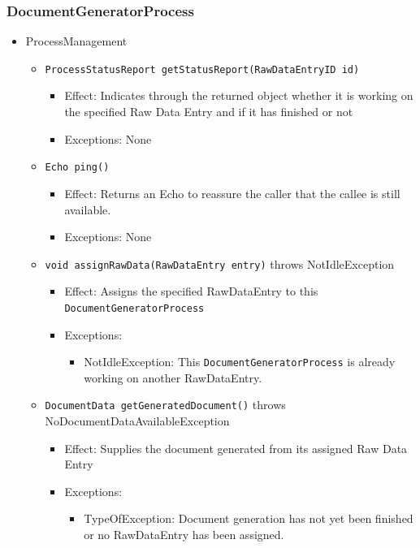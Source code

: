 \documentclass[a4paper,10pt]{article}
\begin{document}
\subsubsection*{DocumentGeneratorProcess}
\begin{itemize}
	\item ProcessManagement
	\begin{itemize}
		\item \texttt{ProcessStatusReport getStatusReport(RawDataEntryID id)}
		\begin{itemize}
			\item Effect: Indicates through the returned object whether it is working on the specified Raw Data Entry and if it has finished or not
			\item Exceptions: None
		\end{itemize}
		
		\item \texttt{Echo ping()}
		\begin{itemize}
			\item Effect: Returns an Echo to reassure the caller that the callee is still available.
			\item Exceptions: None
		\end{itemize}
		
		\item \texttt{void assignRawData(RawDataEntry entry)} throws NotIdleException
		\begin{itemize}
			\item Effect: Assigns the specified RawDataEntry to this \texttt{DocumentGeneratorProcess}
			\item Exceptions: 
			\begin{itemize}
				\item NotIdleException: This \texttt{DocumentGeneratorProcess} is already working on another RawDataEntry.
			\end{itemize}
		\end{itemize}
		
		\item \texttt{DocumentData getGeneratedDocument()} throws NoDocumentDataAvailableException
		\begin{itemize}
			\item Effect: Supplies the document generated from its assigned Raw Data Entry
			\item Exceptions: 
			\begin{itemize}
				\item TypeOfException: Document generation has not yet been finished or no RawDataEntry has been assigned.
			\end{itemize}
		\end{itemize}
	\end{itemize}
\end{itemize}
\end{document}
